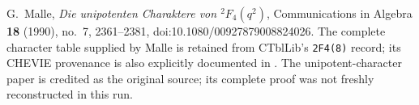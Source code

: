 G.~Malle, \emph{Die unipotenten Charaktere von ${}^2F_4(q^2)$},
Communications in Algebra \textbf{18} (1990), no.~7, 2361--2381,
doi:10.1080/00927879008824026.
The complete character table supplied by Malle is retained from
CTblLib's \texttt{2F4(8)} record; its CHEVIE provenance is also
explicitly documented in \cite[\S10.2, numbered p.~131]{BI:HHM}.
The unipotent-character paper is credited as the original source;
its complete proof was not freshly reconstructed in this run.
